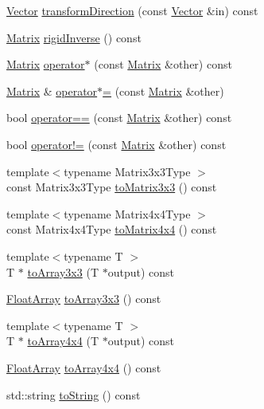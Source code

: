 \begin{DoxyCompactItemize}
\item 
\hyperlink{struct_leap_1_1_vector}{Vector} \hyperlink{struct_leap_1_1_matrix_a6c7151d9d80487f7a16587e9e4896796}{transform\+Direction} (const \hyperlink{struct_leap_1_1_vector}{Vector} \&in) const
\item 
\hyperlink{struct_leap_1_1_matrix}{Matrix} \hyperlink{struct_leap_1_1_matrix_a7fe723887951b2f2259c3e35fb217187}{rigid\+Inverse} () const
\item 
\hyperlink{struct_leap_1_1_matrix}{Matrix} \hyperlink{struct_leap_1_1_matrix_a6d695143ff17c54a421280aee585da6a}{operator$\ast$} (const \hyperlink{struct_leap_1_1_matrix}{Matrix} \&other) const
\item 
\hyperlink{struct_leap_1_1_matrix}{Matrix} \& \hyperlink{struct_leap_1_1_matrix_a44df5bc99d32339961cd0f923c516dcd}{operator$\ast$=} (const \hyperlink{struct_leap_1_1_matrix}{Matrix} \&other)
\item 
bool \hyperlink{struct_leap_1_1_matrix_aa7e006236498192d08492e0e161d6692}{operator==} (const \hyperlink{struct_leap_1_1_matrix}{Matrix} \&other) const
\item 
bool \hyperlink{struct_leap_1_1_matrix_a140da87a056c7944a85a05cd834d90c7}{operator!=} (const \hyperlink{struct_leap_1_1_matrix}{Matrix} \&other) const
\item 
{\footnotesize template$<$typename Matrix3x3\+Type $>$ }\\const Matrix3x3\+Type \hyperlink{struct_leap_1_1_matrix_a8cdd078bc3c45361ab0b5fdcea9befd0}{to\+Matrix3x3} () const
\item 
{\footnotesize template$<$typename Matrix4x4\+Type $>$ }\\const Matrix4x4\+Type \hyperlink{struct_leap_1_1_matrix_a6e77d8f3c86df0dd807f4f9f6bf200fe}{to\+Matrix4x4} () const
\item 
{\footnotesize template$<$typename T $>$ }\\T $\ast$ \hyperlink{struct_leap_1_1_matrix_a76088d466f47ec5203917a8885afb4ef}{to\+Array3x3} (T $\ast$output) const
\item 
\hyperlink{struct_leap_1_1_float_array}{Float\+Array} \hyperlink{struct_leap_1_1_matrix_a311a7a928b61d3e75cb4980b832f163a}{to\+Array3x3} () const
\item 
{\footnotesize template$<$typename T $>$ }\\T $\ast$ \hyperlink{struct_leap_1_1_matrix_ab2a3581b5daee17470d91af3b20928ac}{to\+Array4x4} (T $\ast$output) const
\item 
\hyperlink{struct_leap_1_1_float_array}{Float\+Array} \hyperlink{struct_leap_1_1_matrix_a5faf9ff63d63ff95f6631606e610dc29}{to\+Array4x4} () const
\item 
std\+::string \hyperlink{struct_leap_1_1_matrix_a5ed060fc00784808820940511c342df1}{to\+String} () const
\end{DoxyCompactItemize}
